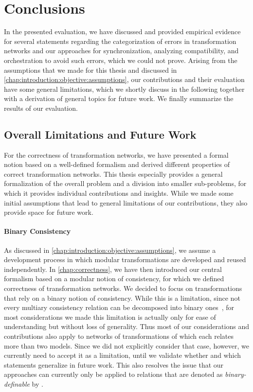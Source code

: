 \section{Conclusions}

In the presented evaluation, we have discussed and provided empirical evidence for several statements regarding the categorization of errors in transformation networks and our approaches for synchronization, analyzing compatibility, and orchestration to avoid such errors, which we could not prove.
Arising from the assumptions that we made for this thesis and discussed in \autoref{chap:introduction:objective:assumptions}, our contributions and their evaluation have some general limitations, which we shortly discuss in the following together with a derivation of general topics for future work.
We finally summarize the results of our evaluation.


\subsection{Overall Limitations and Future Work}

For the correctness of transformation networks, we have presented a formal notion based on a well-defined formalism and derived different properties of correct transformation networks.
This thesis especially provides a general formalization of the overall problem and a division into smaller sub-problems, for which it provides individual contributions and insights.
While we made some initial assumptions that lead to general limitations of our contributions, they also provide space for future work.

\paragraph{Binary Consistency}
As discussed in \autoref{chap:introduction:objective:assumptions}, we assume a development process in which modular transformations are developed and reused independently.
In \autoref{chap:correctness}, we have then introduced our central formalism based on a modular notion of consistency, for which we defined correctness of transformation networks.
We decided to focus on transformations that rely on a binary notion of consistency.
While this is a limitation, since not every multiary consistency relation can be decomposed into binary ones~\cite{stevens2020BidirectionalTransformationLarge-SoSym}, for most considerations we made this limitation is actually only for ease of understanding but without loss of generality.
Thus most of our considerations and contributions also apply to networks of transformations of which each relates more than two models.
Since we did not explicitly consider that case, however, we currently need to accept it as a limitation, until we validate whether and which statements generalize in future work.
This also resolves the issue that our approaches can currently only be applied to relations that are denoted as \emph{binary-definable} by \textcite{stevens2020BidirectionalTransformationLarge-SoSym}.

